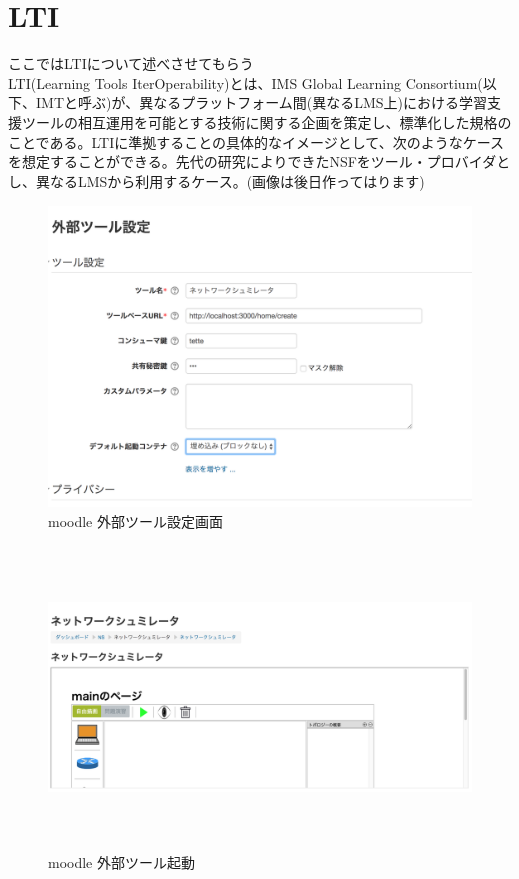 \section{LTI}
\label{tag:LTI}
ここではLTIについて述べさせてもらう\\
LTI(Learning Tools IterOperability)とは、IMS Global Learning Consortium(以下、IMTと呼ぶ)が、異なるプラットフォーム間(異なるLMS上)における学習支援ツールの相互運用を可能とする技術に関する企画を策定し、標準化した規格のことである。LTIに準拠することの具体的なイメージとして、次のようなケースを想定することができる。先代の研究によりできたNSFをツール・プロバイダとし、異なるLMSから利用するケース。(画像は後日作ってはります)\\


\begin{figure}[htbp]
  \begin{center}
    \includegraphics[clip,width=12.0cm,height=8.0cm]{img/moodleSet.png}
    \caption{moodle 外部ツール設定画面}
    \label{fig:moodle config}
  \end{center}
\end{figure}

\begin{figure}[htbp]
  \begin{center}
    \includegraphics[clip,width=12.0cm,height=8.0cm]{img/LTIstart.png}
    \caption{moodle 外部ツール起動}
    \label{fig:moodle kidou}
  \end{center}
\end{figure}
